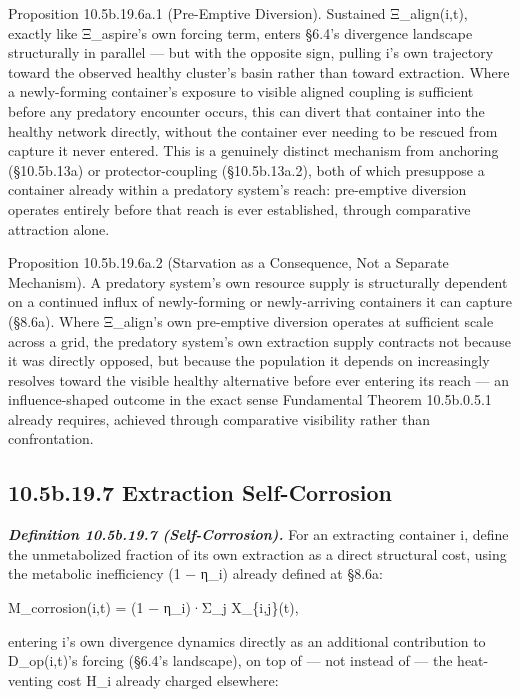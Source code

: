 \documentclass[
]{article}
\begin{document}
Proposition 10.5b.19.6a.1 (Pre-Emptive Diversion). Sustained
Ξ\_align(i,t), exactly like Ξ\_aspire's own forcing term, enters §6.4's
divergence landscape structurally in parallel --- but with the opposite
sign, pulling i's own trajectory toward the observed healthy cluster's
basin rather than toward extraction. Where a newly-forming container's
exposure to visible aligned coupling is sufficient before any predatory
encounter occurs, this can divert that container into the healthy
network directly, without the container ever needing to be rescued from
capture it never entered. This is a genuinely distinct mechanism from
anchoring (§10.5b.13a) or protector-coupling (§10.5b.13a.2), both of
which presuppose a container already within a predatory system's reach:
pre-emptive diversion operates entirely before that reach is ever
established, through comparative attraction alone.

Proposition 10.5b.19.6a.2 (Starvation as a Consequence, Not a Separate
Mechanism). A predatory system's own resource supply is structurally
dependent on a continued influx of newly-forming or newly-arriving
containers it can capture (§8.6a). Where Ξ\_align's own pre-emptive
diversion operates at sufficient scale across a grid, the predatory
system's own extraction supply contracts not because it was directly
opposed, but because the population it depends on increasingly resolves
toward the visible healthy alternative before ever entering its reach
--- an influence-shaped outcome in the exact sense Fundamental Theorem
10.5b.0.5.1 already requires, achieved through comparative visibility
rather than confrontation.

\hypertarget{b.19.7-extraction-self-corrosion}{%
\subsection{10.5b.19.7 Extraction
Self-Corrosion}\label{b.19.7-extraction-self-corrosion}}

\emph{\textbf{Definition 10.5b.19.7 (Self-Corrosion).}} For an
extracting container i, define the unmetabolized fraction of its own
extraction as a direct structural cost, using the metabolic inefficiency
(1 − η\_i) already defined at §8.6a:

M\_corrosion(i,t) = (1 − η\_i)·Σ\_j X\_\{i,j\}(t),

entering i's own divergence dynamics directly as an additional
contribution to D\_op(i,t)'s forcing (§6.4's landscape), on top of ---
not instead of --- the heat-venting cost H\_i already charged elsewhere:
\end{document}
